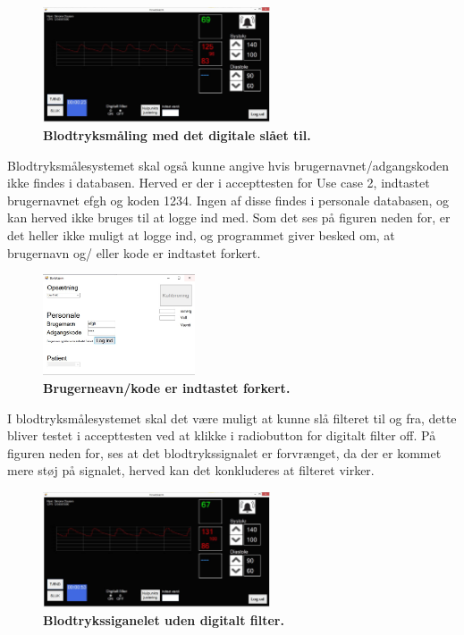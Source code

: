 \begin{figure}[H]
\includegraphics[width =0.6\textwidth , center]{billeder/IThovedGUIkorer}
\caption{\textbf{Blodtryksmåling med det digitale slået til.}}
\end{figure}
Blodtryksmålesystemet skal også kunne angive hvis brugernavnet/adgangskoden ikke findes i databasen. Herved er der i accepttesten for Use case 2, indtastet brugernavnet efgh og koden 1234. Ingen af disse findes i personale databasen, og kan herved ikke bruges til at logge ind med. Som det ses på figuren neden for, er det heller ikke muligt at logge ind, og programmet giver besked om, at brugernavn og/ eller kode er indtastet forkert.
\begin{figure}[H]
\includegraphics[width =0.4\textwidth , center]{billeder/ITstartGUIforkert}
\caption{\textbf{Brugerneavn/kode er indtastet forkert.}}
\end{figure}
I blodtryksmålesystemet skal det være muligt at kunne slå filteret til og fra, dette bliver testet i accepttesten ved at klikke i radiobutton for digitalt filter off. På figuren neden for, ses at det blodtrykssignalet er forvrænget, da der er kommet mere støj på signalet, herved kan det konkluderes at filteret virker. 
\begin{figure}[H]
\includegraphics[width =0.6\textwidth , center]{billeder/IThovedGUIkorerufiltreret}
\caption{\textbf{Blodtrykssiganelet uden digitalt filter.}}
\end{figure}
